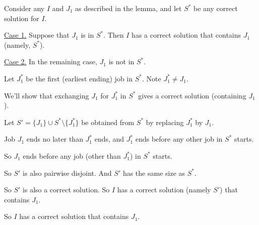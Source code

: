 \begin{blue}

  \begin{longFormProof}
    \step Consider any $I$ and $J_1$ as described in the lemma, and let $S^*$ be any correct solution for $I$.  

    \begin{block}
      \step \underline{Case 1.}  Suppose that $J_1$ is in $S^*$.
      \step Then $I$ has a correct solution that contains $J_1$ (namely, $S^*$).
    \end{block}
    
    \begin{block}

      \step \underline{Case 2.}  In the remaining case, $J_1$ is not in $S^*$.

      \step Let $J_1^*$ be the first (earliest ending) job in $S^*$.  Note $J_1^* \ne J_1$.

      \step We'll show that exchanging $J_1$ for $J_1^*$ in $S^*$ gives a correct solution (containing $J_1$).

      \step Let $S' = \{J_1\}\cup S^* \setminus \{J^*_1\}$ be obtained from $S^*$ by replacing $J^*_1$ by $J_1$.

      \step Job $J_1$ ends no later than $J^*_1$ ends, and $J^*_1$ ends before any other job in $S^*$ starts.
      
      \step So $J_1$ ends before any job (other than $J^*_1$) in $S^*$ starts.

      \step So $S'$ is also pairwise disjoint.  And $S'$ has the same size as $S^*$.

      \step So $S'$ is also a correct solution. So $I$ has a correct solution (namely $S'$) that contains $J_1$.

    \end{block}

    \step So $I$ has a correct solution that contains $J_1$.

  \end{longFormProof}

\end{blue}

